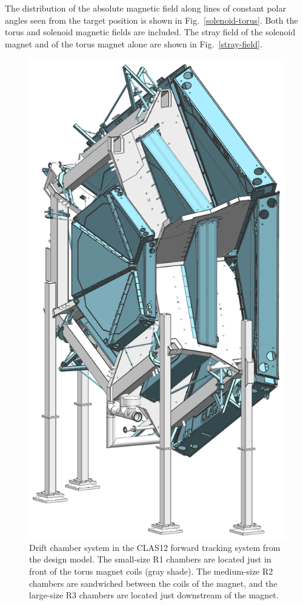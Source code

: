 \documentclass[final,3p,twocolumn]{elsarticle}
\begin{document}
The distribution of the absolute magnetic field along lines of constant polar angles seen from the target position is
shown in Fig.~\ref{solenoid-torus}. Both the torus and solenoid magnetic fields are included. The stray field of the
solenoid magnet and of the torus magnet alone are shown in Fig.~\ref{stray-field}.  

\begin{figure}[ht]
\centerline{\includegraphics[width=0.60\columnwidth]{dc-view-4.png}}
\caption{Drift chamber system in the CLAS12 forward tracking system from the design model. The small-size R1
  chambers are located just in front of the torus magnet coils (gray shade). The medium-size R2 chambers are
  sandwiched between the coils of the magnet, and the large-size R3 chambers are located just downstream of the
  magnet.}
\label{clas12-dc}
\end{figure}
\end{document}
